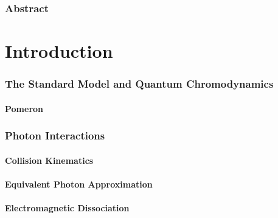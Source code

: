 \documentclass[a4paper,12pt,reqno]{article}
\begin{document}



\section*{Abstract}
\label{section: Abstract}



\newpage
{}

\tableofcontents
\listoffigures
\newpage


\part{Introduction}

\section{The Standard Model and Quantum Chromodynamics}\label{sec:standard model}

%
\subsection{Pomeron}\label{sec:pomeron}

\section{Photon Interactions}\label{sec:photon interaction}

\subsection{Collision Kinematics}

\subsection{Equivalent Photon Approximation}\label{sec:EPA}

\subsection{Electromagnetic Dissociation}\label{sec:EMD}


\end{document}
